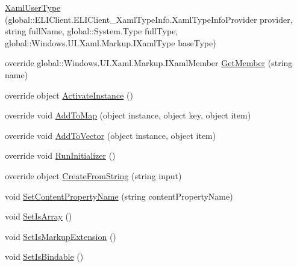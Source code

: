 \begin{DoxyCompactItemize}
\item 
\hyperlink{class_e_l_i_client_1_1_e_l_i_client___xaml_type_info_1_1_xaml_user_type_a909746a87650e014303a361f94cf2fa9}{Xaml\+User\+Type} (global\+::\+E\+L\+I\+Client.\+E\+L\+I\+Client\+\_\+\+Xaml\+Type\+Info.\+Xaml\+Type\+Info\+Provider provider, string full\+Name, global\+::\+System.\+Type full\+Type, global\+::\+Windows.\+U\+I.\+Xaml.\+Markup.\+I\+Xaml\+Type base\+Type)
\item 
override global\+::\+Windows.\+U\+I.\+Xaml.\+Markup.\+I\+Xaml\+Member \hyperlink{class_e_l_i_client_1_1_e_l_i_client___xaml_type_info_1_1_xaml_user_type_ae0b59b2b8f38cd92bb7b5104832683cd}{Get\+Member} (string name)
\item 
override object \hyperlink{class_e_l_i_client_1_1_e_l_i_client___xaml_type_info_1_1_xaml_user_type_ab0cbcd619f25fa68eee6c3472c28d8f8}{Activate\+Instance} ()
\item 
override void \hyperlink{class_e_l_i_client_1_1_e_l_i_client___xaml_type_info_1_1_xaml_user_type_aaae5b06ef5d7b0332b2517490a148da3}{Add\+To\+Map} (object instance, object key, object item)
\item 
override void \hyperlink{class_e_l_i_client_1_1_e_l_i_client___xaml_type_info_1_1_xaml_user_type_a212eb4d186b8a5798d6666f8fbd21921}{Add\+To\+Vector} (object instance, object item)
\item 
override void \hyperlink{class_e_l_i_client_1_1_e_l_i_client___xaml_type_info_1_1_xaml_user_type_a78347a092b725bf90a0ad3a23fc09304}{Run\+Initializer} ()
\item 
override object \hyperlink{class_e_l_i_client_1_1_e_l_i_client___xaml_type_info_1_1_xaml_user_type_a848d739150fec23c2400d5718049ea30}{Create\+From\+String} (string input)
\item 
void \hyperlink{class_e_l_i_client_1_1_e_l_i_client___xaml_type_info_1_1_xaml_user_type_a50b781dfa7e66028905f1c87d6225aa0}{Set\+Content\+Property\+Name} (string content\+Property\+Name)
\item 
void \hyperlink{class_e_l_i_client_1_1_e_l_i_client___xaml_type_info_1_1_xaml_user_type_a0080f0e1e012ffece2004457228b709e}{Set\+Is\+Array} ()
\item 
void \hyperlink{class_e_l_i_client_1_1_e_l_i_client___xaml_type_info_1_1_xaml_user_type_a2c6f690fd071acce19668edc1dfd1f93}{Set\+Is\+Markup\+Extension} ()
\item 
void \hyperlink{class_e_l_i_client_1_1_e_l_i_client___xaml_type_info_1_1_xaml_user_type_a78e1655dc00ebc2b19fc635a881e4b38}{Set\+Is\+Bindable} ()
\item 

\end{DoxyCompactItemize}
